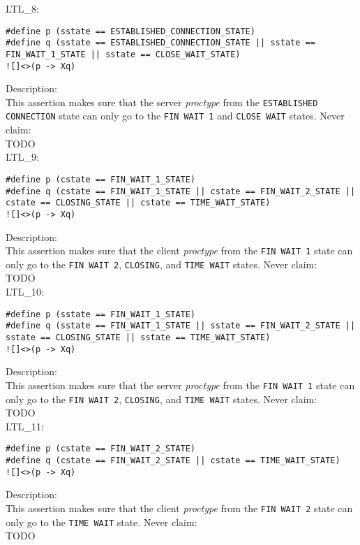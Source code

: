 \documentclass{WigReport}
\begin{document}
LTL\_8:\\
\begin{verbatim}
#define p (sstate == ESTABLISHED_CONNECTION_STATE)
#define q (sstate == ESTABLISHED_CONNECTION_STATE || sstate == FIN_WAIT_1_STATE || sstate == CLOSE_WAIT_STATE)
![]<>(p -> Xq)
\end{verbatim}
Description:\\
This assertion makes sure that the server \textit{proctype} from the \verb|ESTABLISHED CONNECTION| state can only go to the \verb|FIN WAIT 1| and \verb|CLOSE WAIT| states.
Never claim:\\
TODO\\

LTL\_9:\\
\begin{verbatim}
#define p (cstate == FIN_WAIT_1_STATE)
#define q (cstate == FIN_WAIT_1_STATE || cstate == FIN_WAIT_2_STATE || cstate == CLOSING_STATE || cstate == TIME_WAIT_STATE)
![]<>(p -> Xq)
\end{verbatim}
Description:\\
This assertion makes sure that the client \textit{proctype} from the \verb|FIN WAIT 1| state can only go to the \verb|FIN WAIT 2|, \verb|CLOSING|, and \verb|TIME WAIT| states.
Never claim:\\
TODO\\

LTL\_10:\\
\begin{verbatim}
#define p (sstate == FIN_WAIT_1_STATE)
#define q (sstate == FIN_WAIT_1_STATE || sstate == FIN_WAIT_2_STATE || sstate == CLOSING_STATE || sstate == TIME_WAIT_STATE)
![]<>(p -> Xq)
\end{verbatim}
Description:\\
This assertion makes sure that the server \textit{proctype} from the \verb|FIN WAIT 1| state can only go to the \verb|FIN WAIT 2|, \verb|CLOSING|, and \verb|TIME WAIT| states.
Never claim:\\
TODO\\

LTL\_11:\\
\begin{verbatim}
#define p (cstate == FIN_WAIT_2_STATE)
#define q (cstate == FIN_WAIT_2_STATE || cstate == TIME_WAIT_STATE)
![]<>(p -> Xq)
\end{verbatim}
Description:\\
This assertion makes sure that the client \textit{proctype} from the \verb|FIN WAIT 2| state can only go to the \verb|TIME WAIT| state.
Never claim:\\
TODO\\
\end{document}
